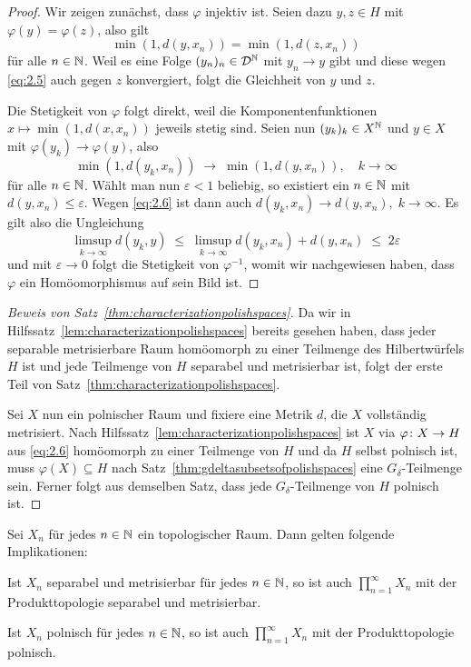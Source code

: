 \documentclass[../main/main.tex]{subfiles}
\begin{document}
	\begin{proof}
		Wir zeigen zunächst, dass $\varphi$ injektiv ist. 
		Seien dazu $y, z \in H$ mit $\varphi(y) = \varphi(z)$, also gilt
		\[\min (1, d(y, x_n)) = \min (1, d(z, x_n)) \label{eq:2.5} \tag{2.5}\]
		für alle $n \in \mathbb{N}$. Weil es eine Folge $(y_n)_n \in \mathcal{D}^{\mathbb{N}}$ mit 
		$y_n \to y$ gibt und diese wegen \eqref{eq:2.5} auch gegen $z$ 
		konvergiert, folgt die Gleichheit von $y$ und $z$.
		
		Die Stetigkeit von $\varphi$ folgt direkt, weil die 
		Komponentenfunktionen $x \mapsto \min (1, d(x, x_n))$ jeweils stetig sind. 
		Seien nun $(y_k)_k \in X^{\mathbb{N}}$ und $y \in X$ mit $\varphi(y_k) \to \varphi(y)$, 
		also
		\[\min (1, d(y_k, x_n)) \; \to \; \min (1, d(y, x_n)), 
		\quad k \to \infty \label{eq:2.6} \tag{2.6}\]
		für alle $n \in \mathbb{N}$. Wählt man nun $\varepsilon < 1$ beliebig, 
		so existiert ein $n \in \mathbb{N}$ mit $d(y, x_n) \leq \varepsilon$. 
		Wegen \eqref{eq:2.6} ist dann auch
		$d(y_k, x_n) \to d(y, x_n), \; k \to \infty$. Es gilt also die Ungleichung
		$$\limsup_{k \to \infty} d(y_k, y) \; \leq \; 
		\limsup_{k \to \infty} d(y_k, x_n) + d(y, x_n) \; \leq \; 2\varepsilon$$
		und mit $\varepsilon \to 0$ folgt die Stetigkeit von $\varphi^{-1}$, 
		womit wir nachgewiesen haben, dass $\varphi$ ein Homöomorphismus auf sein Bild ist. 
	\end{proof}

	\begin{proof}[Beweis von Satz~\ref{thm:characterizationpolishspaces}]
		Da wir in Hilfssatz~\ref{lem:characterizationpolishspaces} bereits 
		gesehen haben, dass jeder separable metrisierbare Raum homöomorph zu einer 
		Teilmenge des Hilbertwürfels $H$ ist und jede Teilmenge von $H$ separabel und metrisierbar ist,
		folgt der erste Teil von Satz~\ref{thm:characterizationpolishspaces}. 
		
		Sei $X$ nun ein polnischer Raum und fixiere eine Metrik $d$, die $X$ vollständig metrisiert. 
		Nach Hilfssatz~\ref{lem:characterizationpolishspaces} ist $X$ via $\varphi \colon X \to H$ aus \eqref{eq:2.6}
		homöomorph zu einer Teilmenge von $H$ und da $H$ selbst polnisch ist, muss $\varphi(X) \subseteq H$ nach 
		Satz~\ref{thm:gdeltasubsetsofpolishspaces} eine $G_\delta$-Teilmenge sein.
		Ferner folgt aus demselben Satz, dass jede $G_\delta$-Teilmenge von $H$ polnisch ist.
	\end{proof}

	\begin{Folgerung}
		\label{cor:productsofpolishspaces}
		Sei $X_n$ für jedes $n \in \mathbb{N}$ ein topologischer Raum. Dann gelten folgende Implikationen:
		\begin{enumeratethm}
			\item Ist $X_n$ separabel und metrisierbar für jedes $n \in \mathbb{N}$, so ist auch $\prod_{n=1}^{\infty} X_n$ mit der Produkttopologie separabel und metrisierbar.
			\item Ist $X_n$ polnisch für jedes $n \in \mathbb{N}$, so ist auch $\prod_{n=1}^{\infty} X_n$ mit der Produkttopologie polnisch.
		\end{enumeratethm}
	\end{Folgerung}
\end{document}

